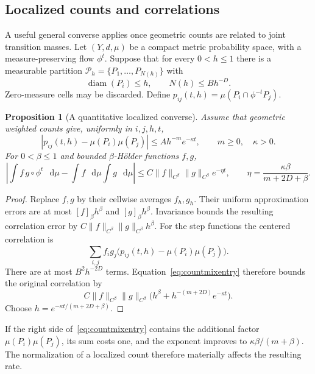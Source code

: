 \documentclass[11pt,a4paper]{article}
\numberwithin{equation}{section}
\newtheorem{proposition}[theorem]{Proposition}
\theoremstyle{definition}
\theoremstyle{remark}
\newcommand{\dd}{\mathop{}\!\mathrm d}
\begin{document}
\subsection{Localized counts and correlations}
\label{subsec:countmixlocalized}

A useful general converse applies once geometric counts are related
to joint transition masses. Let $(Y,d,\mu)$ be a compact metric
probability space, with a measure-preserving flow $\phi^t$. Suppose
that for every $0<h\leq1$ there is a measurable partition
$\mathcal P_h=\{P_1,\ldots,P_{N(h)}\}$ with
\[
 \operatorname{diam}(P_i)\leq h,\qquad N(h)\leq B h^{-D}.
\]
Zero-measure cells may be discarded. Define
$p_{ij}(t,h)=\mu(P_i\cap\phi^{-t}P_j)$.

\begin{proposition}[A quantitative localized converse]
\label{prop:countmixlocalized}
Assume that geometric weighted counts give, uniformly in $i,j,h,t$,
\begin{equation}
 |p_{ij}(t,h)-\mu(P_i)\mu(P_j)|
       \leq A h^{-m}e^{-\kappa t},
 \qquad m\geq0,\quad\kappa>0.
 \label{eq:countmixentry}
\end{equation}
For $0<\beta\leq1$ and bounded $\beta$-H\"older functions $f,g$,
\begin{equation}
 \left|\int f\,g\circ\phi^t\,\dd\mu-\int f\,\dd\mu\int g\,\dd\mu\right|
 \leq C\|f\|_{C^\beta}\|g\|_{C^\beta}e^{-\eta t},
 \qquad
 \eta=\frac{\kappa\beta}{m+2D+\beta}.
 \label{eq:countmixrate}
\end{equation}
\end{proposition}

\begin{proof}
Replace $f,g$ by their cellwise averages $f_h,g_h$. Their uniform
approximation errors are at most $[f]_\beta h^\beta$ and
$[g]_\beta h^\beta$. Invariance bounds the resulting correlation
error by $C\|f\|_{C^\beta}\|g\|_{C^\beta}h^\beta$.
For the step functions the centered correlation is
\[
 \sum_{i,j}f_i g_j
       \bigl(p_{ij}(t,h)-\mu(P_i)\mu(P_j)\bigr).
\]
There are at most $B^2h^{-2D}$ terms. Equation~\eqref{eq:countmixentry}
therefore bounds the original correlation by
\[
 C\|f\|_{C^\beta}\|g\|_{C^\beta}
       \bigl(h^\beta+h^{-(m+2D)}e^{-\kappa t}\bigr).
\]
Choose $h=e^{-\kappa t/(m+2D+\beta)}$.
\end{proof}

If the right side of~\eqref{eq:countmixentry} contains the additional
factor $\mu(P_i)\mu(P_j)$, its sum costs one, and the exponent
improves to $\kappa\beta/(m+\beta)$. The normalization of a localized
count therefore materially affects the resulting rate.
\end{document}
